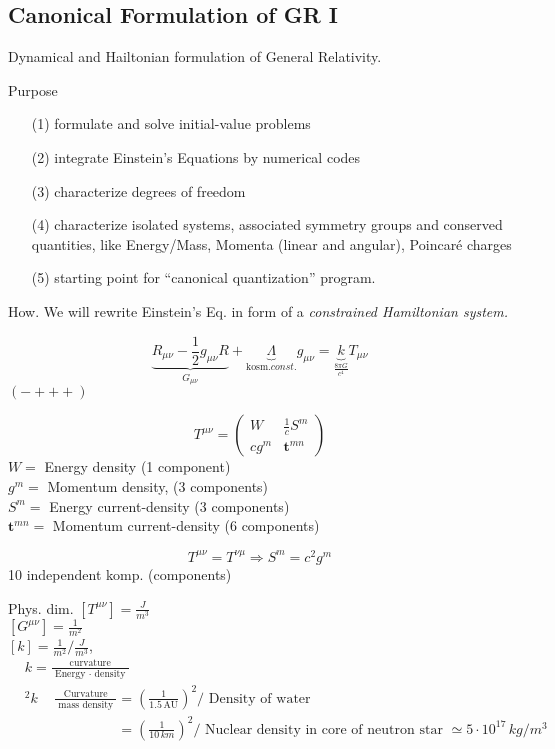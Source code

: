 \documentclass[10pt, twoside]{amsart}
\begin{document}
\begin{multicols*}{2}
\section{Canonical Formulation of GR I}

Dynamical and Hailtonian formulation of General Relativity.

Purpose
\begin{enumerate}
\item[(1)] formulate and solve initial-value problems
\item[(2)] integrate Einstein's Equations by numerical codes
\item[(3)] characterize degrees of freedom
\item[(4)] characterize isolated systems, associated symmetry groups and conserved quantities, like Energy/Mass, Momenta (linear and angular), Poincar\'e charges
\item[(5)] starting point for ``canonical quantization'' program.
\end{enumerate}

How. We will rewrite Einstein's Eq. in form of a \emph{constrained Hamiltonian system.}  

\hrulefill

\[
\underbrace{R_{\mu \nu} - \frac{1}{2}g_{\mu \nu}R}_{G_{\mu \nu}} + \underbrace{\Lambda}_{\text{kosm.} const.} g_{\mu \nu} = \underbrace{k}_{ \frac{ 8 \pi G}{c^4} } T_{\mu \nu}   
\]
$(-+++)$

\[
T^{\mu \nu} = \left( \begin{matrix} W & \frac{1}{c} S^m \\
  c g^m & \mathbf{t}^{mn} \end{matrix} \right)
\]
$W = $ Energy density (1 component)\\
$g^m =$ Momentum density, (3 components) \\
$S^m = $ Energy current-density (3 components)\\
$\mathbf{t}^{mn} = $ Momentum current-density (6 components)

\[
T^{\mu \nu} = T^{\nu \mu} \Longrightarrow S^m = c^2 g^m
\]
10 independent komp. (components)

Phys. dim. $[T^{\mu \nu}] = \frac{J}{m^3} $ \\
\phantom{Phys. dim} $[G^{\mu \nu}] = \frac{1}{m^2}$ \\
\phantom{Phys. dim} $[k] = \frac{1}{m^2}/ \frac{J}{m^3}$, $\begin{aligned} & k = \frac{ \text{ curvature }}{ \text{ Energy } \cdot \text{ density }} \\
  & ^2 k  \quad \, \frac{ \text{ Curvature } }{ \text{ mass density }} = \left( \frac{1}{1.5 \, \text{AU} } \right)^2/ \text{ Density of water } \\
  & \phantom{^2 k  \quad \, \frac{ \text{ Curvature } }{ \text{ mass density }}} = \left( \frac{1}{ 10 \, km} \right)^2 / \text{ Nuclear density in core of neutron star  } \simeq 5 \cdot 10^{17} \, kg/m^3 \end{aligned}$


\end{multicols*}
\end{document}
